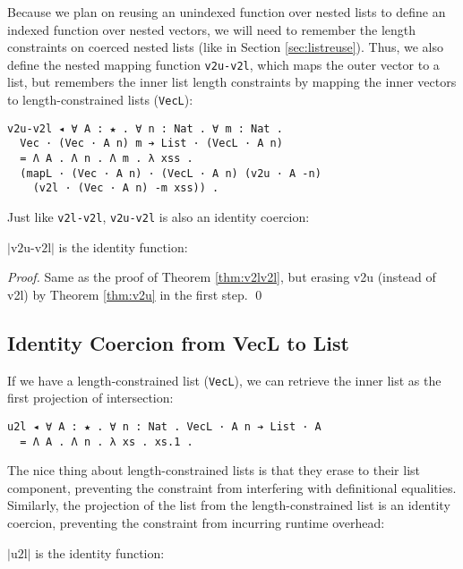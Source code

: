 \documentclass[a4paper,envcountsame,envcountsect]{llncs}
\newcommand{\refsec}[1]{Section \ref{sec:#1}}
\newcommand{\refthm}[1]{Theorem \ref{thm:#1}}
\newcommand{\labthm}[1]{\label{thm:#1}}
\newcommand{\lablem}[1]{\label{lem:#1}}
\newcommand{\erase}[1]{\ensuremath{\lvert #1 \rvert}}
\newcommand{\name}[1]{\textrm{#1}}
\begin{document}
Because we plan on reusing an unindexed function over nested lists to
define an indexed function over nested vectors, we will need to
remember the length constraints on coerced nested lists
(like in \refsec{listreuse}). Thus, we also define the
nested mapping function \texttt{v2u-v2l}, which maps the outer vector
to a list, but remembers the inner list length constraints by mapping
the inner vectors to length-constrained lists (\texttt{VecL}):

\begin{verbatim}
v2u-v2l ◂ ∀ A : ★ . ∀ n : Nat . ∀ m : Nat .
  Vec · (Vec · A n) m ➔ List · (VecL · A n)
  = Λ A . Λ n . Λ m . λ xss .
  (mapL · (Vec · A n) · (VecL · A n) (v2u · A -n)
    (v2l · (Vec · A n) -m xss)) .
\end{verbatim}

Just like \texttt{v2l-v2l}, \texttt{v2u-v2l} is also an identity
coercion:

\begin{theorem}
\erase{\name{v2u-v2l}} is the identity function:
\labthm{v2uv2l}
\end{theorem}

\begin{proof}
{\small
  Same as the proof of \refthm{v2lv2l}, but erasing
  \name{v2u} (instead of \name{v2l})
  by \refthm{v2u} in the first step. \qed
}
\end{proof}

\subsection{Identity Coercion from VecL to List}

If we have a length-constrained list (\texttt{VecL}), we can retrieve
the inner list as the first projection of intersection:

\begin{verbatim}
u2l ◂ ∀ A : ★ . ∀ n : Nat . VecL · A n ➔ List · A
  = Λ A . Λ n . λ xs . xs.1 .
\end{verbatim}

The nice thing about length-constrained lists is that they erase to
their list component, preventing the constraint from interfering with
definitional equalities. Similarly, the projection of the list from
the length-constrained list is an identity coercion, preventing the
constraint from incurring runtime overhead:

\begin{lemma}
\erase{\name{u2l}} is the identity function:
\lablem{u2l}
\end{lemma}
\end{document}
